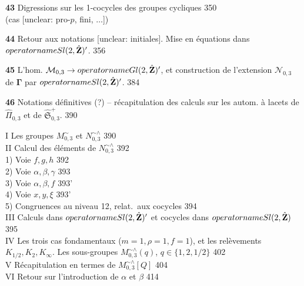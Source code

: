 \vspace{0.5cm}
\noindent \textbf{43} Digressions sur les 1-cocycles des groupes cycliques \hfill 350 \\
(cas [unclear: pro-$p$, fini, $\dots$])

\vspace{0.5cm}
\noindent \textbf{44} Retour aux notations [unclear: initiales]. Mise en équations dans $\\operatorname{Sl}(2, \hat{\mathbf{Z}})'$. \hfill 356

\vspace{0.5cm}
\noindent \textbf{45} L'hom. $\mathcal{M}_{0,3} \to \\operatorname{Gl}(2, \hat{\mathbf{Z}})'$, et construction de l'extension $\mathcal{N}_{0,3}$ de $\boldsymbol{\Gamma}$ par $\\operatorname{Sl}(2, \hat{\mathbf{Z}})'$. \hfill 384

\vspace{0.5cm}
\noindent \textbf{46} Notations définitives (?) -- récapitulation des calculs sur les autom. à lacets de $\hat{\Pi}_{0,3}$ et de $\hat{\mathfrak{S}}_{0,3}^+$. \hfill 390

\newpage


\noindent I Les groupes $M_{0,3}^{\sim}$ et $N_{0,3}^{\sim \wedge}$ \hfill 390\\
II Calcul des éléments de $N_{0,3}^{\sim \wedge}$ \hfill 392\\
\hspace*{1em} 1) Voie $f, g, h$ \hfill 392\\
\hspace*{1em} 2) Voie $\alpha, \beta, \gamma$ \hfill 393\\
\hspace*{1em} 3) Voie $\alpha, \beta, f$ \hfill 393'\\
\hspace*{1em} 4) Voie $x, y, \xi$ \hfill 393'\\
\hspace*{1em} 5) Congruences au niveau 12, relat.\ aux cocycles \hfill 394\\
III Calculs dans $\\operatorname{Sl}(2,\hat{\mathbf{Z}})'$ et cocycles dans $\\operatorname{Sl}(2,\hat{\mathbf{Z}})$ \hfill 395\\
IV Les trois cas fondamentaux ($m=1, \rho=1, f=1$), et les relèvements $K_{1/2}, K_{2}, K_{\infty}$. Les sous-groupes $M_{0,3}^{\sim \wedge}(q)$, $q \in \{1, 2, 1/2\}$ \hfill 402\\
V Récapitulation en termes de $M_{0,3}^{\sim \wedge}[Q]$  \hfill 404\\
VI Retour sur l'introduction de $\alpha$ et $\beta$ \hfill 414\\

